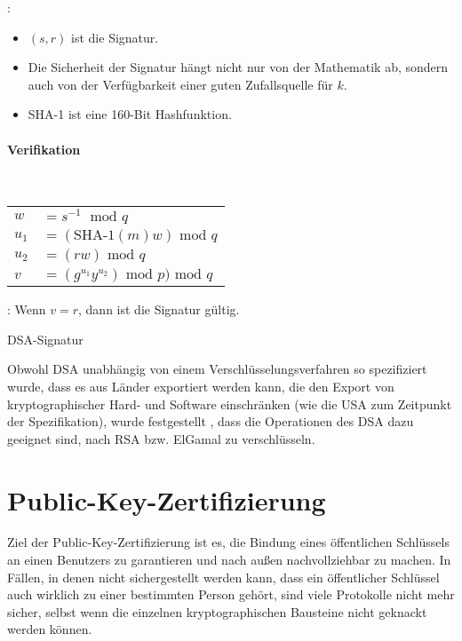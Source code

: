 \begin{refsegment}
\begin{cryptoprocedure}
\begin{remark}{:}
\begin{itemize}
\item $(s,r)$ ist die Signatur.
\item Die Sicherheit der Signatur hängt nicht nur von der Mathematik ab,
sondern auch von der Verfügbarkeit einer guten Zufallsquelle
für $k$.
\item SHA-1  ist eine 160-Bit Hashfunktion.
\end{itemize}
\end{remark}
\paragraph*{Verifikation}\strut\\
\begin{tabular}{l@{ }l}
$w$ & $= s^{-1} \;  \mbox{ mod } q$\\
$u_1$ & $= (\mbox{SHA-1}(m)w) \mbox{ mod } q$\\
$u_2$ & $= (rw)  \mbox{ mod } q$\\
$v$ & $= (g^{u_1}y^{u_2}) \mbox{ mod } p)  \mbox{ mod } q$\\

\end{tabular}

\begin{remark}{:} Wenn $v = r$, dann ist die Signatur gültig.
\end{remark}
\caption{DSA-Signatur}
\label{dsasigproc}
\end{cryptoprocedure}

Obwohl DSA unabhängig von einem Verschlüsselungsverfahren so spezifiziert
wurde, dass es aus Länder exportiert werden kann, die den Export von
kryptographischer Hard- und Software einschränken (wie die USA zum
Zeitpunkt der Spezifikation), wurde festgestellt
\cite[S.~490]{Schneier1996}, dass die Operationen des DSA dazu geeignet
sind, nach RSA bzw. ElGamal zu verschlüsseln.



\section{Public-Key-Zertifizierung}
Ziel der Public-Key-Zertifizierung ist es, die Bindung eines
öffentlichen Schlüssels an einen Benutzers zu garantieren und nach außen
nachvollziehbar zu machen. In Fällen, in denen nicht sichergestellt werden
kann, dass ein öffentlicher Schlüssel auch wirklich zu einer bestimmten
Person gehört, sind viele Protokolle nicht mehr sicher, selbst wenn die
einzelnen kryptographischen Bausteine nicht geknackt werden können.




\end{refsegment}
